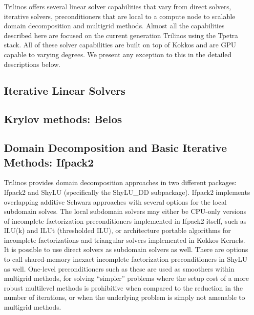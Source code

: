 
Trilinos offers several linear solver capabilities that vary from direct solvers, iterative solvers, preconditioners that are local to a compute node to scalable domain decomposition and multigrid methods. Almost all the capabilities described here are focused on the current generation Trilinos using the Tpetra stack. All of these solver capabilities are built on top of Kokkos and are GPU capable to varying degrees. We present any exception to this in the detailed descriptions below.

\subsection{Iterative Linear Solvers}

\subsection{Krylov methods: Belos}

\subsection{Domain Decomposition and Basic Iterative Methods: Ifpack2}

Trilinos provides domain decomposition approaches in two different
packages: Ifpack2 and ShyLU (specifically the ShyLU\_DD
subpackage). Ifpack2 implements overlapping additive Schwarz
approaches with several options for the local subdomain solves. The
local subdomain solvers may either be CPU-only versions of incomplete
factorization preconditioners implemented in Ifpack2 itself, such as
ILU(k) and ILUt (thresholded ILU), or architecture portable algorithms
for incomplete factorizations and triangular solvers implemented in
Kokkos Kernels. It is possible to use direct solvers as subdomain
solvers as well. There are options to call shared-memory inexact
incomplete factorization preconditioners in ShyLU as well. One-level
preconditioners such as these are used as smoothers within multigrid
methods, for solving ``simpler'' problems where the setup cost of a
more robust multilevel methods is prohibitive when compared to the
reduction in the number of iterations, or when the underlying problem
is simply not amenable to multigrid methods. 

